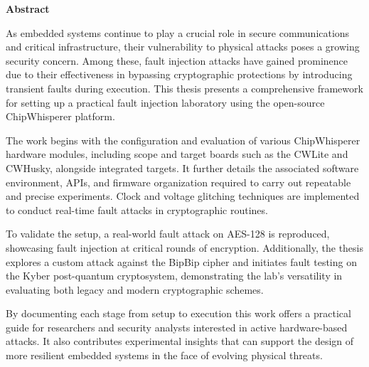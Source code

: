 \cleardoublepage
{}
{}
\thispagestyle{empty}
\textbf{\hspace{0pt plus 1filll}\huge Abstract}
\vspace{15mm}

    As embedded systems continue to play a crucial role in secure communications and critical infrastructure, their vulnerability to physical attacks poses a growing security concern. Among these, fault injection attacks have gained prominence due to their effectiveness in bypassing cryptographic protections by introducing transient faults during execution. This thesis presents a comprehensive framework for setting up a practical fault injection laboratory using the open-source ChipWhisperer platform.
    
    The work begins with the configuration and evaluation of various ChipWhisperer hardware modules, including scope and target boards such as the CWLite and CWHusky, alongside integrated targets. It further details the associated software environment, APIs, and firmware organization required to carry out repeatable and precise experiments. Clock and voltage glitching techniques are implemented to conduct real-time fault attacks in cryptographic routines.
    
    To validate the setup, a real-world fault attack on AES-128 is reproduced, showcasing fault injection at critical rounds of encryption. Additionally, the thesis explores a custom attack against the BipBip cipher and initiates fault testing on the Kyber post-quantum cryptosystem, demonstrating the lab's versatility in evaluating both legacy and modern cryptographic schemes.
    
    By documenting each stage from setup to execution this work offers a practical guide for researchers and security analysts interested in active hardware-based attacks. It also contributes experimental insights that can support the design of more resilient embedded systems in the face of evolving physical threats.
    